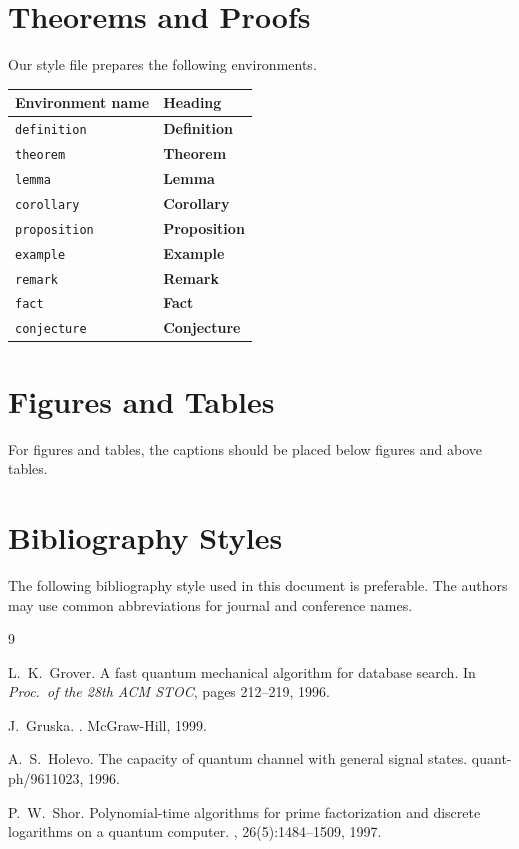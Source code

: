 \documentclass[a4paper]{article}
\begin{document}
\section{Theorems and Proofs}

Our style file prepares the following environments.

\begin{center}
\begin{tabular}{ll}
\hline
Environment name & Heading\\
\hline
{\tt definition} & {\bf Definition}\\
{\tt theorem} & {\bf Theorem}\\
{\tt lemma} & {\bf Lemma}\\
{\tt corollary} & {\bf Corollary}\\
{\tt proposition} & {\bf Proposition}\\
{\tt example} & {\bf Example}\\
{\tt remark} & {\bf Remark}\\
{\tt fact} & {\bf Fact}\\
{\tt conjecture} & {\bf Conjecture}\\
\hline
\end{tabular}
\end{center}

\section{Figures and Tables}

For figures and tables, the captions should be placed
below figures and above tables.

\section{Bibliography Styles}

The following bibliography style used in this document is preferable.
The authors may use common abbreviations for journal and conference names.

\begin{thebibliography}{9}

L.~K.~Grover.
\newblock A fast quantum mechanical algorithm for database search.
\newblock In {\em Proc.\ of the 28th ACM STOC}, pages 212--219, 1996.

J.~Gruska.
.
\newblock McGraw-Hill, 1999.

A.~S.~Holevo.
\newblock The capacity of quantum channel with general signal states.
\newblock quant-ph/9611023, 1996.

P.~W.~Shor.
\newblock Polynomial-time algorithms for prime factorization
and discrete logarithms on a quantum computer.
, 26(5):1484--1509, 1997.

\end{thebibliography}
\end{document}
